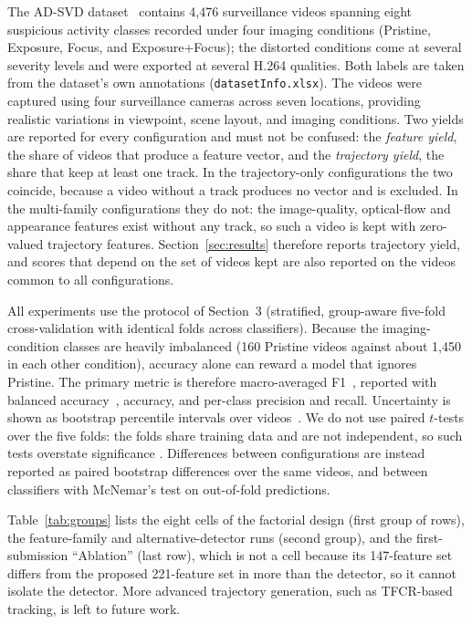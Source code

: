 \documentclass[runningheads]{llncs}
\begin{document}
The AD-SVD dataset~\cite{9698081,akyk-7b78-20} contains 4,476 surveillance
videos spanning eight suspicious activity classes recorded under four
imaging conditions (Pristine, Exposure, Focus, and Exposure+Focus); the distorted
conditions come at several severity levels and were exported at several H.264 qualities.
Both labels are taken from the dataset's own annotations (\texttt{datasetInfo.xlsx}). The videos were captured using four surveillance cameras
across seven locations, providing realistic variations in viewpoint,
scene layout, and imaging conditions. Two yields are reported for every configuration and must not be confused: the
\emph{feature yield}, the share of videos that produce a feature vector, and the
\emph{trajectory yield}, the share that keep at least one track. In the trajectory-only
configurations the two coincide, because a video without a track produces no vector and
is excluded. In the multi-family configurations they do not: the image-quality, optical-flow
and appearance features exist without any track, so such a video is kept with zero-valued
trajectory features. Section~\ref{sec:results} therefore reports trajectory yield, and
scores that depend on the set of videos kept are also reported on the videos common to all
configurations.

All experiments use the protocol of Section~3 (stratified, group-aware five-fold
cross-validation with identical folds across classifiers). Because the imaging-condition
classes are heavily imbalanced (160 Pristine videos against about 1,450 in each other
condition), accuracy alone can reward a model that ignores Pristine. The primary metric is
therefore macro-averaged F1~\cite{sokolova2009systematic}, reported with balanced
accuracy~\cite{brodersen2010balanced}, accuracy, and per-class precision and recall.
Uncertainty is shown as bootstrap percentile intervals over
videos~\cite{efron1993bootstrap}. We do not use paired $t$-tests over the five folds: the folds
share training data and are not independent, so such tests overstate significance
\cite{dietterich1998approximate,nadeau2003inference}. Differences between configurations are
instead reported as paired bootstrap differences over the same videos, and between classifiers
with McNemar's test on out-of-fold predictions.

Table~\ref{tab:groups} lists the eight cells of the factorial design (first group of rows), the
feature-family and alternative-detector runs (second group), and the first-submission ``Ablation''
(last row), which is not a cell because its 147-feature set differs from the proposed 221-feature
set in more than the detector, so it cannot isolate the detector. More advanced trajectory generation, such as
TFCR-based tracking, is left to future work.
\end{document}
